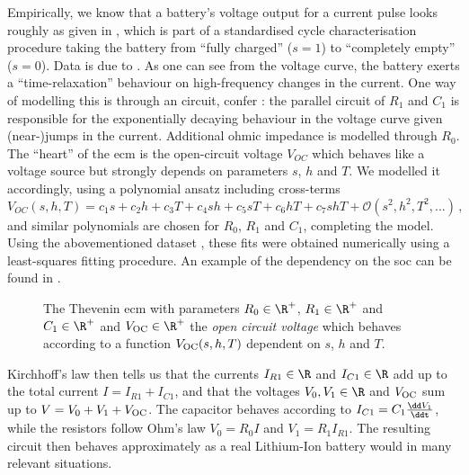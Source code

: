\documentclass{prettytex/ox/mmsc-special-topic}
\begin{document}
  Empirically, we know that a battery's voltage output for a current pulse looks roughly as given in , which is part of a standardised cycle characterisation procedure taking the battery from ``fully charged'' ($s=1$) to ``completely empty'' ($s=0$). Data is due to \cite{panasonicnums}.
  As one can see from the voltage curve, the battery exerts a ``time-relaxation'' behaviour on high-frequency changes in the current.
  One way of modelling this is through an  circuit, confer : the parallel circuit of $R_1$ and $C_1$ is responsible for the exponentially decaying behaviour in the voltage curve given (near-)jumps in the current.
  Additional ohmic impedance is modelled through $R_0$.
  The ``heart'' of the \gls{ecm} is the open-circuit voltage $V_{OC}$ which behaves like a voltage source but strongly depends on parameters $s$, $h$ and $T$.
  We modelled it accordingly, using a polynomial ansatz including cross-terms $$V_{OC}(s, h, T) = c_1 s + c_2 h + c_3 T + c_4 sh + c_5 sT + c_6 hT + c_7 shT + \mathcal{O}(s^2, h^2, T^2, ...)\,,$$
  and similar polynomials are chosen for $R_0$, $R_1$ and $C_1$, completing the model.
  Using the abovementioned dataset \parencite{panasonicnums}, these fits were obtained numerically using a least-squares fitting procedure. An example of the dependency on the \gls{soc} can be found in .

  \begin{figure}[H]
    \centering
    \caption{
      The Thevenin \gls{ecm} with parameters $R_0 \in \R^+$, $R_1 \in \R^+$ and $C_1 \in \R^+$ and $V_{\rm OC} \in \R^+$ the \textit{open circuit voltage} which behaves according to a function $V_{\rm OC}(s, h, T)$ dependent on $s$, $h$ and $T$.
    }
    \label{fig:ecm}
  \end{figure}

  Kirchhoff's law then tells us that the currents $I_{R1} \in \R$ and $I_{C1} \in \R$ add up to the total current $I = I_{R1} + I_{C1}$, and that the voltages $V_0, V_1 \in \R$ and $V_{\rm OC}$ sum up to $V = V_0 + V_1 + V_{\rm OC}$.
  The capacitor behaves according to $I_{C1} = C_1 \frac{\dd V_1}{\ddt}$, while the resistors follow Ohm's law $V_0 = R_0 I$ and $V_1 = R_1 I_{R1}$.
  The resulting circuit then behaves approximately as a real Lithium-Ion battery would in many relevant situations.
\end{document}
